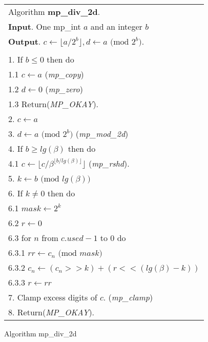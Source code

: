 \documentclass[b5paper]{book}
\begin{document}
\newpage\begin{figure}[!here]
\begin{small}
\begin{center}
\begin{tabular}{l}
\hline Algorithm \textbf{mp\_div\_2d}. \\
\textbf{Input}.   One mp\_int $a$ and an integer $b$ \\
\textbf{Output}.  $c \leftarrow \lfloor a / 2^b \rfloor, d \leftarrow a \mbox{ (mod }2^b\mbox{)}$. \\
\hline \\
1.  If $b \le 0$ then do \\
\hspace{3mm}1.1  $c \leftarrow a$ (\textit{mp\_copy}) \\
\hspace{3mm}1.2  $d \leftarrow 0$ (\textit{mp\_zero}) \\
\hspace{3mm}1.3  Return(\textit{MP\_OKAY}). \\
2.  $c \leftarrow a$ \\
3.  $d \leftarrow a \mbox{ (mod }2^b\mbox{)}$ (\textit{mp\_mod\_2d}) \\
4.  If $b \ge lg(\beta)$ then do \\
\hspace{3mm}4.1  $c \leftarrow \lfloor c/\beta^{\lfloor b/lg(\beta) \rfloor} \rfloor$ (\textit{mp\_rshd}). \\
5.  $k \leftarrow b \mbox{ (mod }lg(\beta)\mbox{)}$ \\
6.  If $k \ne 0$ then do \\
\hspace{3mm}6.1  $mask \leftarrow 2^k$ \\
\hspace{3mm}6.2  $r \leftarrow 0$ \\
\hspace{3mm}6.3  for $n$ from $c.used - 1$ to $0$ do \\
\hspace{6mm}6.3.1  $rr \leftarrow c_n \mbox{ (mod }mask\mbox{)}$ \\
\hspace{6mm}6.3.2  $c_n \leftarrow (c_n >> k) + (r << (lg(\beta) - k))$ \\
\hspace{6mm}6.3.3  $r \leftarrow rr$ \\
7.  Clamp excess digits of $c$.  (\textit{mp\_clamp}) \\
8.  Return(\textit{MP\_OKAY}). \\
\hline
\end{tabular}
\end{center}
\end{small}
\caption{Algorithm mp\_div\_2d}
\end{figure}
\end{document}

